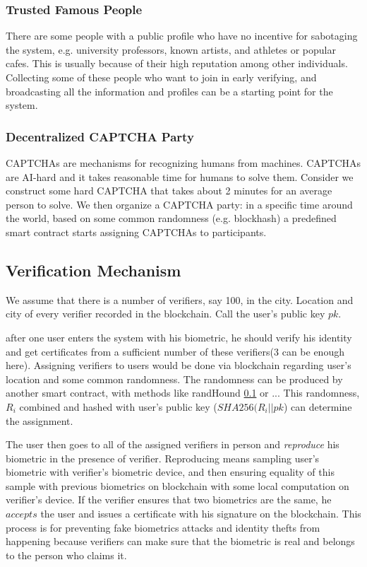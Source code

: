 \documentclass[conference]{IEEEtran}
\begin{document}
\subsubsection*{Trusted Famous People}
There are some people with a public profile who have no incentive for sabotaging the system, e.g. university professors, known artists, and athletes or popular cafes. This is usually because of their high reputation among other individuals. Collecting some of these people who want to join in early verifying, and broadcasting all the information and profiles can be a starting point for the system.

\subsubsection*{Decentralized CAPTCHA Party}
CAPTCHAs \cite{CAPTCHA} are mechanisms for recognizing humans from machines. CAPTCHAs are AI-hard and it takes reasonable time for humans to solve them. Consider we construct some hard CAPTCHA that takes about 2 minutes for an average person to solve. We then organize a CAPTCHA party: in a specific time around the world, based on some common randomness (e.g. blockhash) a predefined smart contract starts assigning CAPTCHAs to participants. 

\subsection{Verification Mechanism}
We assume that there is a number of verifiers, say 100, in the city. Location and city of every verifier recorded in the blockchain. Call the user's public key $pk$.


 after one user enters the system with his biometric, he should verify his identity and get certificates from a sufficient number of these verifiers(3 can be enough here). Assigning verifiers to users would be done via blockchain regarding user's location and some common randomness. The randomness can be produced by another smart contract, with methods like randHound \ref{} or ...   This randomness,$ R_i$ combined and hashed with user's public key ($SHA256(R_i || pk$) can determine the assignment. 
 
 
The user then goes to all of the assigned verifiers in person and \textit{reproduce}  his biometric in the presence of verifier. Reproducing means sampling user's biometric with verifier's biometric device, and then ensuring equality of this sample with previous biometrics on blockchain with some local computation on verifier's device. If the verifier ensures that two biometrics are the same, he $accepts$ the user and issues a certificate with his signature on the blockchain. This process is for preventing fake biometrics attacks and identity thefts from happening because verifiers can make sure that the biometric is real and belongs to the person who claims it. 
\end{document}
